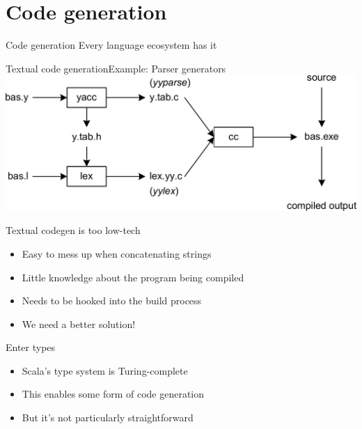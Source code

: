 \documentclass{beamer}
\begin{document}
  \section{Code generation}


\begin{frame}[fragile]{Code generation}
  Every language ecosystem has it
\end{frame}

\begin{frame}[fragile]{Textual code generation}{Example: Parser generators}
  \includegraphics[width=\linewidth]{img/yacc.png}
\end{frame}

\begin{frame}[fragile]{Textual codegen is too low-tech}
  \begin{itemize}
    \item Easy to mess up when concatenating strings
    \item Little knowledge about the program being compiled
    \item Needs to be hooked into the build process
    \item We need a better solution!
  \end{itemize}
\end{frame}

\begin{frame}{Enter types}
  \begin{itemize}
    \item Scala's type system is Turing-complete
    \item This enables some form of code generation
    \item But it's not particularly straightforward
  \end{itemize}
\end{frame}
\end{document}
